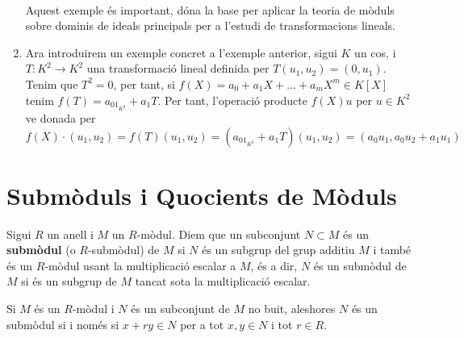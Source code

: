 \begin{enumerate}[(1)]
  \\
  Aquest exemple és important, dóna la base per aplicar la teoria de mòduls sobre dominis de ideals principals per a l'estudi de transformacions lineals.
  \item Ara introduirem un exemple concret a l'exemple anterior, sigui $K$ un cos, i $T:K^2\rightarrow K^2$ una transformació lineal definida per $T(u_1,u_2)=(0,u_1)$. Tenim que $T^2=0$, per tant, si $f(X)=a_0+a_1X+\dots+a_mX^m\in K[X]$ tenim $f(T)=a_01_{K^2}+a_1T$. Per tant, l'operació producte $f(X)u$ per $u\in K^2$ ve donada per 
  $$
  f(X)\cdot (u_1,u_2)=f(T)(u_1,u_2)=(a_01_{K^2}+a_1T)(u_1,u_2)=(a_0u_1,a_0u_2+a_1u_1)
  $$
\end{enumerate}
\section{Submòduls i Quocients de Mòduls}
\begin{definition}
Sigui $R$ un anell i $M$ un $R$-mòdul. Diem que un subconjunt $N\subset M$ és un \textbf{submòdul} (o $R$-submòdul) de $M$ si $N$ és un subgrup del grup additiu $M$ i també és un $R$-mòdul usant la multiplicació escalar a $M$, és a dir, $N$ és un submòdul de $M$ si és un subgrup de $M$ tancat sota la multiplicació escalar. 
\end{definition}

\begin{lema}
Si $M$ és un $R$-mòdul i $N$ és un subconjunt de $M$ no buit, aleshores $N$ és un submòdul si i només si $x+ry\in N$ per a tot $x,y\in N$ i tot $r\in R$.
\end{lema}

